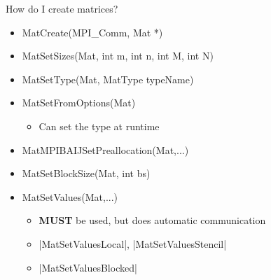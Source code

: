 \begin{frame}{How do I create matrices?}

\begin{itemize}
  \item {\kb MatCreate(MPI\_Comm, Mat *)}
  \item {\kb MatSetSizes(Mat, int m, int n, int M, int N)}
  \item {\kb MatSetType(Mat, MatType typeName)}
  \item {\kb MatSetFromOptions(Mat)}
  \begin{itemize}
    \item Can set the type at runtime
  \end{itemize}
  \item {\kb MatMPIBAIJSetPreallocation(Mat,...)} %
  \item {\kb MatSetBlockSize(Mat, int bs)}
  \item {\kb MatSetValues(Mat,...)}
  \begin{itemize}
    \item {\bf MUST} be used, but does automatic communication
    \item \cfunc|MatSetValuesLocal|, \cfunc|MatSetValuesStencil|
    \item \cfunc|MatSetValuesBlocked|
  \end{itemize}
\end{itemize}
\end{frame}
